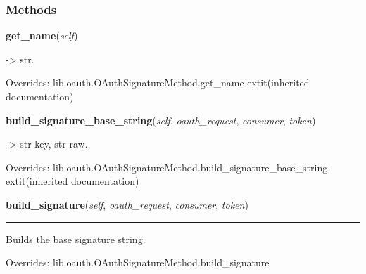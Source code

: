 
  \subsubsection{Methods}

    \vspace{0.5ex}

\hspace{.8\funcindent}\begin{boxedminipage}{\funcwidth}

    \raggedright \textbf{get\_name}(\textit{self})

\setlength{\parskip}{2ex}
    -{\textgreater} str.

\setlength{\parskip}{1ex}
      Overrides: lib.oauth.OAuthSignatureMethod.get\_name 	extit{(inherited documentation)}

    \end{boxedminipage}

    \vspace{0.5ex}

\hspace{.8\funcindent}\begin{boxedminipage}{\funcwidth}

    \raggedright \textbf{build\_signature\_base\_string}(\textit{self}, \textit{oauth\_request}, \textit{consumer}, \textit{token})

\setlength{\parskip}{2ex}
    -{\textgreater} str key, str raw.

\setlength{\parskip}{1ex}
      Overrides: lib.oauth.OAuthSignatureMethod.build\_signature\_base\_string 	extit{(inherited documentation)}

    \end{boxedminipage}

    \vspace{0.5ex}

\hspace{.8\funcindent}\begin{boxedminipage}{\funcwidth}

    \raggedright \textbf{build\_signature}(\textit{self}, \textit{oauth\_request}, \textit{consumer}, \textit{token})

    \vspace{-1.5ex}

    \rule{\textwidth}{0.5\fboxrule}
\setlength{\parskip}{2ex}
    Builds the base signature string.

\setlength{\parskip}{1ex}
      Overrides: lib.oauth.OAuthSignatureMethod.build\_signature

    \end{boxedminipage}


